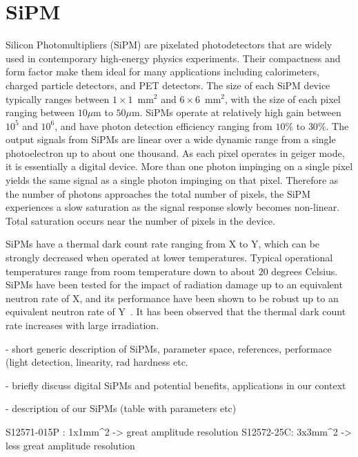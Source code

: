 \section{SiPM}
\label{sec:sipm}

Silicon Photomultipliers (SiPM) are pixelated photodetectors that are widely
used in contemporary high-energy physics experiments. Their compactness and form
factor make them ideal for many applications including calorimeters, charged
particle detectors, and PET detectors. The size of each SiPM device typically
ranges between $1\times 1$~$\mathrm{mm}^{2}$ and $6\times 6$~$\mathrm{mm}^{2}$,
with the size of each pixel ranging between $10\mu$m to $50\mu$m. SiPMs operate
at relatively high gain between $10^{5}$ and $10^{6}$, and have photon detection
efficiency ranging from $10\%$ to $30\%$. The output signals from SiPMs are
linear over a wide dynamic range from a single photoelectron up to about one
thousand. As each pixel operates in geiger mode, it is essentially a digital
device. More than one photon impinging on a single pixel yields the same signal
as a single photon impinging on that pixel. Therefore as the number of photons
approaches the total number of pixels, the SiPM experiences a slow saturation as
the signal response slowly becomes non-linear. Total saturation occurs near the
number of pixels in the device. 

SiPMs have a thermal dark count rate ranging from X to Y, which can be strongly 
decreased when operated at lower temperatures. Typical operational temperatures 
range from room temperature down to about $20$ degrees Celsius. SiPMs have been
tested for the impact of radiation damage up to an equivalent neutron rate of X, 
and its performance have been shown to be robust up to an equivalent neutron 
rate of Y~\cite{stuff}. It has been observed that the thermal dark count rate increases with 
large irradiation.


- short generic description of SiPMs, parameter space, references, performace (light detection, linearity, rad hardness etc.

- briefly discuss digital SiPMs and potential benefits, applications in our context

- description of our SiPMs (table with parameters etc)

S12571-015P : 1x1mm^2 -> great amplitude resolution
S12572-25C: 3x3mm^2 -> less great amplitude resolution
